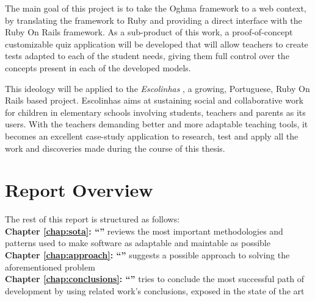 The main goal of this project is to take the Oghma \cite{FCA09} framework to a web context, by translating the framework to Ruby and providing a direct interface with the Ruby On Rails framework. As a sub-product of this work, a proof-of-concept customizable quiz application will be developed that will allow teachers to create tests adapted to each of the student needs, giving them full control over the concepts present in each of the developed models.

This ideology will be applied to the \textit{Escolinhas} \cite{escolinhas}, a growing, Portuguese, Ruby On Rails based project. Escolinhas aims at sustaining social and collaborative work for children in elementary schools involving students, teachers and parents as its users. With the teachers demanding better and more adaptable teaching tools, it becomes an excellent case-study application to research, test and apply all the work and discoveries made during the course of this thesis.

\section{Report Overview}\label{sec:structure}

The rest of this report is structured as follows:\\

\textbf{Chapter \ref{chap:sota}: ``'' } reviews the most important methodologies and patterns used to make software as adaptable and maintable as possible\\

\textbf{Chapter \ref{chap:approach}: ``'' } suggests a possible approach to solving the aforementioned problem\\

\textbf{Chapter \ref{chap:conclusions}: ``'' } tries to conclude the most successful path of development by using related work’s conclusions, exposed in the state of the art %

